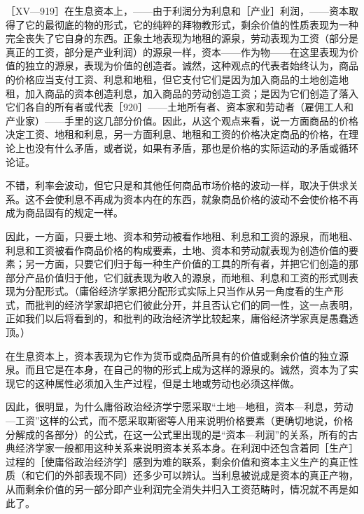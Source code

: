 
［XV—919］在生息资本上，——由于利润分为利息和［产业］利润，——资本取得了它的最彻底的物的形式，它的纯粹的拜物教形式，剩余价值的性质表现为一种完全丧失了它自身的东西。正象土地表现为地租的源泉，劳动表现为工资（部分是真正的工资，部分是产业利润）的源泉一样，资本——作为物——在这里表现为价值的独立的源泉，表现为价值的创造者。诚然，这种观点的代表者始终认为，商品的价格应当支付工资、利息和地租，但它支付它们是因为加入商品的土地创造地租，加入商品的资本创造利息，加入商品的劳动创造工资；是因为它们创造了落入它们各自的所有者或代表［920］——土地所有者、资本家和劳动者（雇佣工人和产业家）——手里的这几部分价值。因此，从这个观点来看，说一方面商品的价格决定工资、地租和利息，另一方面利息、地租和工资的价格决定商品的价格，在理论上也没有什么矛盾，或者说，如果有矛盾，那也是价格的实际运动的矛盾或循环论证。

不错，利率会波动，但它只是和其他任何商品市场价格的波动一样，取决于供求关系。这不会使利息不再成为资本内在的东西，就象商品价格的波动不会使价格不再成为商品固有的规定一样。

因此，一方面，只要土地、资本和劳动被看作地租、利息和工资的源泉，而地租、利息和工资被看作商品价格的构成要素，土地、资本和劳动就表现为创造价值的要素；另一方面，只要它们归于每一种生产价值的工具的所有者，并把它们创造的那部分产品价值归于他，它们就表现为收入的源泉，而地租、利息和工资的形式则表现为分配形式。（庸俗经济学家把分配形式实际上只当作从另一角度看的生产形式，而批判的经济学家却把它们彼此分开，并且否认它们的同一性，这一点表明，正如我们以后将看到的，和批判的政治经济学比较起来，庸俗经济学家真是愚蠢透顶。）

在生息资本上，资本表现为它作为货币或商品所具有的价值或剩余价值的独立源泉。而且它是在本身，在自己的物的形式上成为这样的源泉的。诚然，资本为了实现它的这种属性必须加入生产过程，但是土地或劳动也必须这样做。

因此，很明显，为什么庸俗政治经济学宁愿采取“土地—地租，资本—利息，劳动—工资”这样的公式，而不愿采取斯密等人用来说明价格要素（更确切地说，价格分解成的各部分）的公式，在这一公式里出现的是“资本—利润”的关系，所有的古典经济学家一般都用这种关系来说明资本关系本身。在利润中还包含着同［生产］过程的［使庸俗政治经济学］感到为难的联系，剩余价值和资本主义生产的真正性质（和它们的外部表现不同）还多少可以辨认。当利息被说成是资本的真正产物，从而剩余价值的另一部分即产业利润完全消失并归入工资范畴时，情况就不再是如此了。

